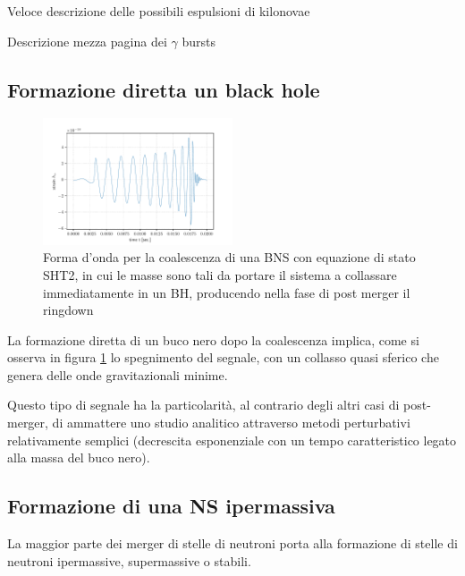 Veloce descrizione delle possibili espulsioni di kilonovae

Descrizione mezza pagina dei $\gamma$ bursts

\subsection{Formazione diretta un black hole}	
\begin{figure}
	\vspace{-30pt}
	\begin{center}
		\includegraphics[width=0.5\textwidth]{figures/Capitolo_1/SHT2.2.pdf}
	\end{center}
	\vspace{-10pt}
	\caption{Forma d'onda per la coalescenza di una BNS con equazione di stato SHT2, in cui le masse sono tali da portare il sistema a collassare immediatamente in un BH, producendo nella fase di post merger il ringdown}
	\label{fig:FormaOndaBH}
	\vspace{-20pt}
\end{figure}

La formazione diretta di un buco nero dopo la coalescenza implica, come si osserva in figura \ref{fig:FormaOndaBH} lo spegnimento del segnale, con un collasso quasi sferico che genera delle onde gravitazionali minime\cite{sarin2020evolution}.

Questo tipo di segnale ha la particolarità, al contrario degli altri casi di post-merger, di ammattere uno studio analitico attraverso metodi perturbativi relativamente semplici (decrescita esponenziale con un tempo caratteristico legato alla massa del buco nero)\cite{maggiore2018gravitational}.

\subsection{Formazione di una NS ipermassiva}	
La maggior parte dei merger di stelle di neutroni porta alla formazione di stelle di neutroni ipermassive, supermassive o stabili. 

